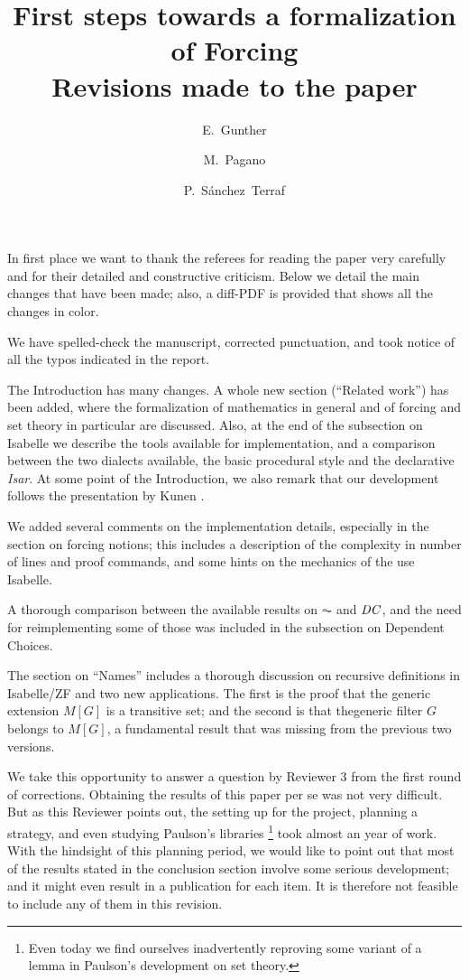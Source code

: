\documentclass[11pt,english]{article}
\begin{document}
\title{First steps towards a formalization of Forcing
  \\ Revisions made to the paper}
\author{E.~Gunther \and  M.~Pagano \and P.~S\'anchez~Terraf
}
\date{}
\maketitle

In first place we want to thank the referees for reading the paper very
carefully and for their detailed and constructive criticism. Below we
detail the main changes that have been made; also, a diff-PDF is
provided that shows all the changes in color.

We have spelled-check the manuscript, corrected punctuation, and took
notice of all the typos indicated in the report. 

The Introduction has many changes. A whole new section (``Related
work'') has been added, where the formalization of mathematics in
general and of forcing and set theory in particular are discussed.
Also, at the end of the subsection on Isabelle we describe the tools
available for implementation, and a comparison
between the two dialects available, the basic procedural style and the
declarative \emph{Isar}. At some point of the Introduction, we also
remark that our 
development follows the presentation by Kunen \cite{kunen2011set}. 

We added several comments on the implementation details, especially in
the section on forcing notions; this includes a description of the
complexity in number of lines and proof commands, and some hints on
the mechanics of the use Isabelle.

A thorough comparison between the available results on $\AC$ and
$\mathit{DC}$, and the need for reimplementing some of those was included in
the subsection on Dependent Choices.

The section on ``Names'' includes a thorough discussion on recursive
definitions in Isabelle/ZF and two new applications. The first is the proof
that the generic extension $M[G]$ is a transitive set; and the second
is that thegeneric filter $G$ belongs to $M[G]$, a fundamental result
that was missing from the previous two versions.

We take this opportunity to answer a question by Reviewer 3 from the
first round of corrections. Obtaining the results of this paper per se
was not very difficult. But as this Reviewer points out, the setting
up for the project, planning a strategy, and even studying Paulson's
libraries%
\footnote{Even today we find ourselves inadvertently reproving some
  variant of a lemma in Paulson's development on set theory.}
took almost an year of work. With the hindsight of this planning
period, we would like to point out that most of the results stated in
the conclusion section involve some serious development; and it might
even result in a publication for each item. It is therefore not
feasible to include any of them in this revision.
%
%


\end{document}
